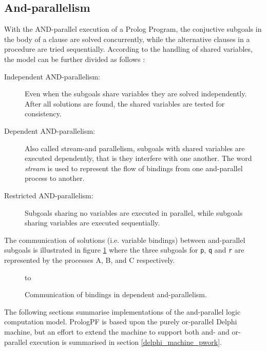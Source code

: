 \subsection{And-parallelism}
\label{and_parallelism_section}


With the AND-parallel execution of a Prolog Program, the conjuctive subgoals in the
body of a clause are solved concurrently, while the alternative clauses in a
procedure are tried sequentially. According to the handling of shared variables,
the model can be further divided as follows \cite{CK81}:
\begin{description}
\item[Independent AND-parallelism:]{ Even when the subgoals share variables
  they are solved independently.  After all solutions are found, the shared
  variables are tested for consistency.}
\item[Dependent AND-parallelism:]{ Also called stream-and parallelism, subgoals
  with shared variables are executed dependently, that is they interfere with
  one another.  The word \textit{stream} is used to represent the flow of bindings
  from one and-parallel process to another.}
\item[Restricted AND-parallelism:]{ Subgoals sharing no variables are executed in
  parallel, while subgoals sharing variables are executed sequentially.}
\end{description}

The communication of solutions (i.e. variable bindings) between and-parallel
subgoals is illustrated in figure \ref{stream} where the three subgoals for
\texttt{p}, \texttt{q} and \texttt{r} are
represented by the processes A, B, and C respectively.

\begin{figure}[h]
\vspace{5mm} \hbox to 
\caption{Communication of bindings in dependent and-parallelism.}
\vspace{5mm}
\label{stream}
\end{figure}

The following sections summarise implementations of the and-parallel logic computation
model.  PrologPF is based upon the purely or-parallel Delphi machine, but an effort
to extend the machine to support both and- and or-parallel execution \cite{Wre90}
is summarised in section \ref{delphi_machine_pwork}.

